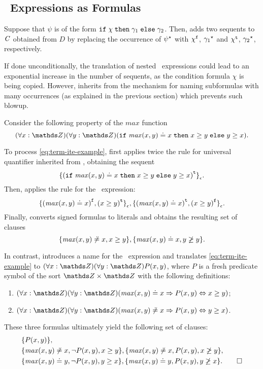 \subsection*{\ITE\ Expressions as Formulas}
Suppose that $\psi$ is of the form $\mathtt{if}\;{\chi}\;\allowbreak\mathtt{then}\;{\gamma_1}\;\allowbreak\mathtt{else}\;{\gamma_2}$. 
Then, \nfcnf{} adds two sequents to $\mathit{C}$ obtained from $D$ by replacing the occurrence of ${\psi}^{\star}$ with ${\chi}^{\mathtt{f}}$, ${\gamma_1}^{\star}$ and ${\chi}^{\mathtt{t}}$, ${\gamma_2}^{\star}$, respectively.

If done unconditionally, the translation of nested \ITE\ expressions could lead to an exponential increase in the number of sequents,
as the condition formula $\chi$ is being copied. However, \nfcnf{} inherits from \newcnf{} the mechanism 
for naming subformulas with many occurrences (as explained in the previous section) which prevents such blowup.

\begin{example*} Consider the following property of the $\mathit{max}$ function
\begin{equation}\label{eq:term-ite-example}
  (\forall x:\Z)(\forall y:\Z)(\ite{\mathit{max}(x, y) \eql x}{x \geq y}{y \geq x}).
\end{equation}

To process \eqref{eq:term-ite-example}, \nfcnf{} first applies twice the rule for universal quantifier inherited from \newcnf{}, obtaining the sequent $${{\{(\mathtt{if}\;{\mathit{max}(x, y) \doteq x}\;\allowbreak\mathtt{then}\;{x \geq y}\;\allowbreak\mathtt{else}\;{y \geq x})}^{\mathtt{t}}\}}_{\epsilon}.$$ Then, \nfcnf{} applies the rule for the \ITE\ expression: $${ \{ {(\mathit{max}(x,y) \doteq x)}^{\mathtt{f}} , {(x \geq y)}^{\mathtt{t}} \} }_{\epsilon}, { \{ {(\mathit{max}(x,y) \doteq x)}^{\mathtt{t}} , {(x \geq y)}^{\mathtt{f}} \} }_{\epsilon}.$$ Finally, \nfcnf{} converts signed formulas to literals and obtains the resulting set of clauses $$\{ \mathit{max}(x,y) \not\doteq x, x \geq y \}, \{ \mathit{max}(x,y) \doteq x, y \not\geq y \}.$$

In contrast, \oldcnf{} introduces a name for the \ITE\ expression and translates \eqref{eq:term-ite-example} to $(\forall x:\Z)(\forall y:\Z)P(x,y)$, where $P$ is a fresh predicate symbol of the sort $\Z \times \Z$ with the following definitions:
\begin{enumerate}
  \item $(\forall x:\Z)(\forall y:\Z)(\mathit{max}(x, y) \eql     x \implies P(x,y) \liff x \geq y)$;
  \item $(\forall x:\Z)(\forall y:\Z)(\mathit{max}(x, y) \not\eql x \implies P(x,y) \liff y \geq x)$.
\end{enumerate}

These three formulas ultimately yield the following set of clauses:
\begin{align*}
&\{P(x,y)\},\\
&\{\mathit{max}(x, y) \not\eql x, \neg P(x,y), x \geq y\},\{\mathit{max}(x, y) \not\eql x, P(x,y), x \not\geq y\},\\
&\{\mathit{max}(x, y) \eql y, \neg P(x,y), y \geq x\},\{\mathit{max}(x, y) \eql y, P(x,y), y \not\geq x\}.\QED
\end{align*}
\end{example*}

